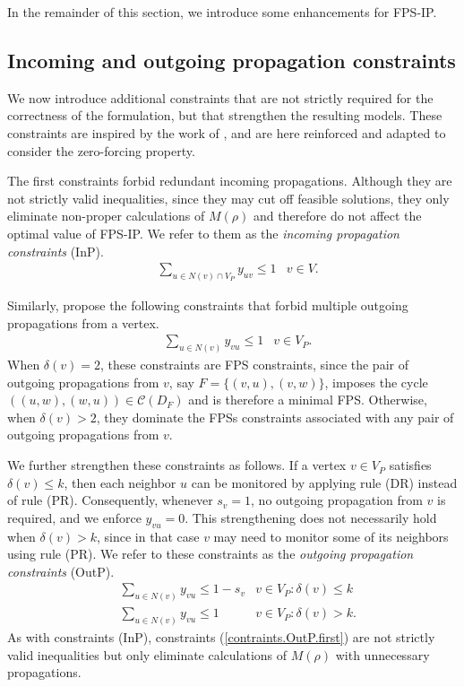 \documentclass{article}
\newcommand{\CC}{{\mathscr C}}
\newcommand{\FPSIP}{FPS-IP\xspace}
\begin{document}
In the remainder of this section, we introduce some enhancements for \FPSIP.

\subsection{Incoming and outgoing propagation constraints}\label{sec.incoming.outgoing.constraints}

We now introduce additional constraints that are not strictly required for the correctness of the formulation, but that strengthen the resulting models. 
These constraints are inspired by the work of \citet{Jovanovic2020}, and are here reinforced and adapted to consider the zero-forcing property.

The first constraints forbid redundant incoming propagations.
Although they are not strictly valid inequalities, since they may cut off feasible solutions, they only eliminate non-proper calculations of $M(\rho)$ and therefore do not affect the optimal value of \FPSIP. 
We refer to them as the \emph{incoming propagation constraints} (InP).
\begin{align}
& \sum_{u \in N(v) \cap V_P} y_{uv} \leq 1 & v \in V. \label{FPSIP.In.Prop}
\end{align}

Similarly, \citet{Jovanovic2020} propose the following constraints that forbid multiple outgoing propagations from a vertex.
\begin{align}
&\sum_{u \in N(v)} y_{vu} \leq 1 & v \in V_P.
\end{align}
When $\delta(v) = 2$, these constraints are FPS constraints, since the pair of outgoing propagations from $v$, say $F = \{(v,u),(v,w)\}$, imposes the cycle $((u,w),(w,u)) \in \CC(D_F)$ and is therefore a minimal FPS.
Otherwise, when $\delta(v) > 2$, they dominate the FPSs constraints associated with any pair of outgoing propagations from $v$.

We further strengthen these constraints as follows.
If a vertex $v \in V_P$ satisfies $\delta(v) \leq k$, then each neighbor $u$ can be monitored by applying rule (DR) instead of rule (PR).
Consequently, whenever $s_v = 1$, no outgoing propagation from $v$ is required, and we enforce $y_{vu} = 0$.
This strengthening does not necessarily hold when $\delta(v) > k$, since in that case $v$ may need to monitor some of its neighbors using rule (PR).
We refer to these constraints as the \emph{outgoing propagation constraints} (OutP).
\begin{align}
&\sum_{u \in N(v)} y_{vu} \leq 1 - s_v & v \in V_P: \delta(v) \leq k \label{contraints.OutP.first} \\ 
&\sum_{u \in N(v)} y_{vu} \leq 1 & v \in V_P: \delta(v) > k.
\end{align}
As with constraints (InP), constraints (\ref{contraints.OutP.first}) are not strictly valid inequalities but only eliminate calculations of $M(\rho)$ with unnecessary propagations.
\end{document}
